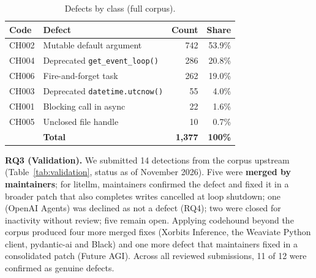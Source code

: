 \documentclass[conference]{IEEEtran}
\begin{document}
\begin{table}[t]
\caption{Defects by class (full corpus).}
\label{tab:byclass}
\centering
\begin{tabular}{llrr}
\toprule
Code & Defect & Count & Share \\
\midrule
CH002 & Mutable default argument & 742 & 53.9\% \\
CH004 & Deprecated \texttt{get\_event\_loop()} & 286 & 20.8\% \\
CH006 & Fire-and-forget task & 262 & 19.0\% \\
CH003 & Deprecated \texttt{datetime.utcnow()} & 55 & 4.0\% \\
CH001 & Blocking call in async & 22 & 1.6\% \\
CH005 & Unclosed file handle & 10 & 0.7\% \\
\midrule
& \textbf{Total} & \textbf{1{,}377} & \textbf{100\%} \\
\bottomrule
\end{tabular}
\end{table}

\textbf{RQ3 (Validation).} We submitted 14 detections from the corpus upstream (Table~\ref{tab:validation}, status as of November 2026). Five were \textbf{merged by maintainers}; for litellm, maintainers confirmed the defect and fixed it in a broader patch that also completes writes cancelled at loop shutdown; one (OpenAI Agents) was declined as not a defect (RQ4); two were closed for inactivity without review; five remain open. Applying codehound beyond the corpus produced four more merged fixes (Xorbits Inference, the Weaviate Python client, pydantic-ai and Black) and one more defect that maintainers fixed in a consolidated patch (Future AGI). Across all reviewed submissions, 11 of 12 were confirmed as genuine defects.
\end{document}
